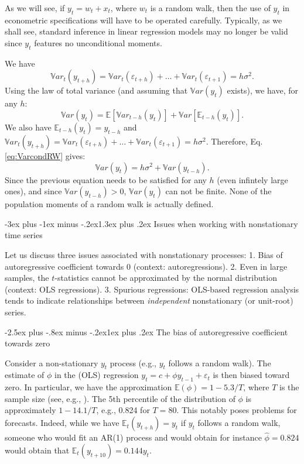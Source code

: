 \documentclass[
  11pt,
]{book}
\makeatletter
\renewcommand\section{\@startsection{section}{1}{\z@}
  {-3ex plus -1ex minus -.2ex}{1.3ex plus .2ex}
  {\normalfont\Large\bfseries\color{TextbookInk}}}
\renewcommand\subsection{\@startsection{subsection}{2}{\z@}
  {-2.5ex plus -.8ex minus -.2ex}{1ex plus .2ex}
  {\normalfont\large\bfseries\color{TextbookInk}}}
\theoremstyle{definition}
\theoremstyle{definition}
\theoremstyle{definition}
\theoremstyle{definition}
\theoremstyle{remark}
\makeatother
\begin{document}
As we will see, if \(y_t = w_t + x_t\), where \(w_t\) is a random walk, then the use of \(y_t\) in econometric specifications will have to be operated carefully. Typically, as we shall see, standard inference in linear regression models may no longer be valid since \(y_t\) features no unconditional moments.

We have
\[
\mathbb{V}ar_t(y_{t+h})=\mathbb{V}ar_t(\varepsilon_{t+h})+\dots+\mathbb{V}ar_t(\varepsilon_{t+1})=h\sigma^2.
\]
Using the law of total variance (and assuming that \(\mathbb{V}ar(y_t)\) exists), we have, for any \(h\):
\begin{equation}
\mathbb{V}ar(y_t) = \mathbb{E}[\mathbb{V}ar_{t-h}(y_{t})]+\mathbb{V}ar[\mathbb{E}_{t-h}(y_{t})].\label{eq:VarcondRW}
\end{equation}
We also have \(\mathbb{E}_{t-h}(y_t)=y_{t-h}\) and \(\mathbb{V}ar_t(y_{t+h})=\mathbb{V}ar_t(\varepsilon_{t+h})+\dots+\mathbb{V}ar_t(\varepsilon_{t+1})=h\sigma^2\). Therefore, Eq. \eqref{eq:VarcondRW} gives:
\[
\mathbb{V}ar(y_t) = h\sigma^2 + \mathbb{V}ar(y_{t-h}).
\]
Since the previous equation needs to be satisfied for any \(h\) (even infintely large ones), and since \(\mathbb{V}ar(y_{t-h})>0\), \(\mathbb{V}ar(y_t)\) can not be finite. None of the population moments of a random walk is actually defined.

\section{Issues when working with nonstationary time series}\label{issues-when-working-with-nonstationary-time-series}

Let us discuss three issues associated with nonstationary processes:
1. Bias of autoregressive coefficient towards 0 (context: autoregressions).
2. Even in large samples, the \(t\)-statistics cannot be approximated by the normal distribution (context: OLS regressions).
3. Spurious regressions: OLS-based regression analysis tends to indicate relationships between \emph{independent} nonstationary (or unit-root) series.

\subsection{The bias of autoregressive coefficient towards zero}\label{the-bias-of-autoregressive-coefficient-towards-zero}

Consider a non-stationary \(y_t\) process (e.g., \(y_t\) follows a random walk). The estimate of \(\phi\) in the (OLS) regression \(y_t = c + \phi y_{t-1} + \varepsilon_t\) is then biased toward zero. In particular, we have the approximation \(\mathbb{E}(\phi)=1-5.3/T\), where \(T\) is the sample size (see, e.g., \citet{Abadir_1993}). The 5th percentile of the distribution of \(\phi\) is approximately \(1 - 14.1/T\), e.g., 0.824 for \(T=80\). This notably poses problems for forecasts. Indeed, while we have \(\mathbb{E}_t(y_{t+h})=y_t\) if \(y_t\) follows a random walk, someone who would fit an AR(1) process and would obtain for instance \(\hat\phi=0.824\) would obtain that \(\mathbb{E}_t(y_{t+10})=0.144y_t\).
\end{document}
